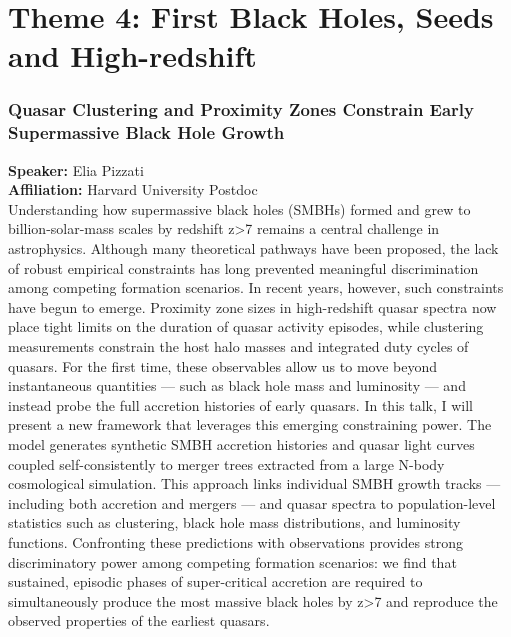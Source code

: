 \section*{Theme 4: First Black Holes, Seeds and High-redshift}

\hypertarget{abs-65}{}
\subsubsection*{Quasar Clustering and Proximity Zones Constrain Early Supermassive Black Hole Growth}
\textbf{Speaker:} Elia Pizzati \\
\textbf{Affiliation:} Harvard University \textperiodcentered{} Postdoc\\
Understanding how supermassive black holes (SMBHs) formed and grew to billion-solar-mass scales by redshift z>7 remains a central challenge in astrophysics. Although many theoretical pathways have been proposed, the lack of robust empirical constraints has long prevented meaningful discrimination among competing formation scenarios.
In recent years, however, such constraints have begun to emerge. Proximity zone sizes in high-redshift quasar spectra now place tight limits on the duration of quasar activity episodes, while clustering measurements constrain the host halo masses and integrated duty cycles of quasars. For the first time, these observables allow us to move beyond instantaneous quantities — such as black hole mass and luminosity — and instead probe the full accretion histories of early quasars.
In this talk, I will present a new framework that leverages this emerging constraining power. The model generates synthetic SMBH accretion histories and quasar light curves coupled self-consistently to merger trees extracted from a large N-body cosmological simulation. This approach links individual SMBH growth tracks — including both accretion and mergers — and quasar spectra to population-level statistics such as clustering, black hole mass distributions, and luminosity functions.
Confronting these predictions with observations provides strong discriminatory power among competing formation scenarios: we find that sustained, episodic phases of super-critical accretion are required to simultaneously produce the most massive black holes by z>7 and reproduce the observed properties of the earliest quasars.


